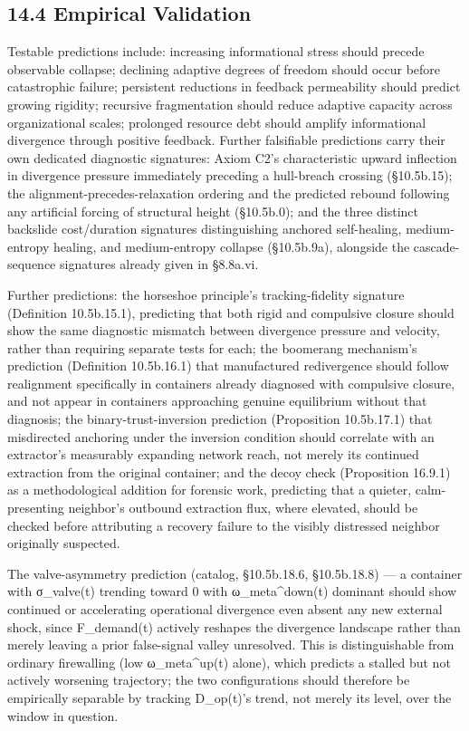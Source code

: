 \documentclass[
]{article}
\begin{document}
\hypertarget{empirical-validation}{%
\subsection{14.4 Empirical Validation}\label{empirical-validation}}

Testable predictions include: increasing informational stress should
precede observable collapse; declining adaptive degrees of freedom
should occur before catastrophic failure; persistent reductions in
feedback permeability should predict growing rigidity; recursive
fragmentation should reduce adaptive capacity across organizational
scales; prolonged resource debt should amplify informational divergence
through positive feedback. Further falsifiable predictions carry their
own dedicated diagnostic signatures: Axiom C2's characteristic upward
inflection in divergence pressure immediately preceding a hull-breach
crossing (§10.5b.15); the alignment-precedes-relaxation ordering and the
predicted rebound following any artificial forcing of structural height
(§10.5b.0); and the three distinct backslide cost/duration signatures
distinguishing anchored self-healing, medium-entropy healing, and
medium-entropy collapse (§10.5b.9a), alongside the cascade-sequence
signatures already given in §8.8a.vi.

Further predictions: the horseshoe principle's tracking-fidelity
signature (Definition 10.5b.15.1), predicting that both rigid and
compulsive closure should show the same diagnostic mismatch between
divergence pressure and velocity, rather than requiring separate tests
for each; the boomerang mechanism's prediction (Definition 10.5b.16.1)
that manufactured redivergence should follow realignment specifically in
containers already diagnosed with compulsive closure, and not appear in
containers approaching genuine equilibrium without that diagnosis; the
binary-trust-inversion prediction (Proposition 10.5b.17.1) that
misdirected anchoring under the inversion condition should correlate
with an extractor's measurably expanding network reach, not merely its
continued extraction from the original container; and the decoy check
(Proposition 16.9.1) as a methodological addition for forensic work,
predicting that a quieter, calm-presenting neighbor's outbound
extraction flux, where elevated, should be checked before attributing a
recovery failure to the visibly distressed neighbor originally
suspected.

The valve-asymmetry prediction (catalog, §10.5b.18.6, §10.5b.18.8) --- a
container with σ\_valve(t) trending toward 0 with ω\_meta\^{}down(t)
dominant should show continued or accelerating operational divergence
even absent any new external shock, since F\_demand(t) actively reshapes
the divergence landscape rather than merely leaving a prior false-signal
valley unresolved. This is distinguishable from ordinary firewalling
(low ω\_meta\^{}up(t) alone), which predicts a stalled but not actively
worsening trajectory; the two configurations should therefore be
empirically separable by tracking D\_op(t)'s trend, not merely its
level, over the window in question.
\end{document}
